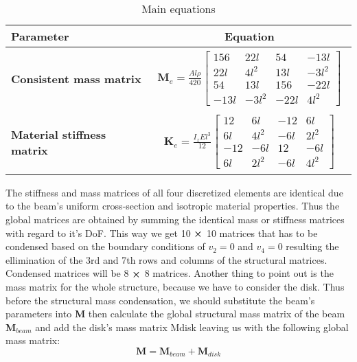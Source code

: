 \documentclass[12pt]{article}
\begin{document}
\begin{table}[H]
\centering
\caption{Main equations}
\label{tab:important_equations}
\renewcommand{\arraystretch}{1.2}
\begin{tabular}{lc}
\textbf{Parameter} & \textbf{Equation} \\
\hline
\textbf{Consistent mass matrix} &  \parbox{10cm}{\begin{align} \textbf{M}_e = \frac{Al\rho}{420} \begin{bmatrix}
156 & 22l & 54 & -13l \\
22l & 4l^2 & 13l & -3l^2 \\
54 & 13l & 156 & -22l \\
-13l & -3l^2 & -22l & 4l^2
\end{bmatrix}  \end{align}} \\

\textbf{Material stiffness matrix} & \parbox{10cm}{\begin{align} \textbf{K}_e = \frac{I_z El^3}{12} \begin{bmatrix}
12 & 6l & -12 & 6l \\
6l & 4l^2 & -6l & 2l^2 \\
-12 & -6l & 12 & -6l \\
6l & 2l^2 & -6l & 4l^2
\end{bmatrix}  \end{align}} \\

\end{tabular}
\end{table}
The stiffness and mass matrices of all four discretized elements are identical due to the beam's uniform cross-section and isotropic material properties. Thus the global matrices are obtained by summing the identical mass or stiffness matrices with regard to it's DoF. This way we get 10 $\cross$ 10 matrices that has to be condensed based on the boundary conditions of $v_2 = 0$ and $v_4= 0$ resulting the ellimination of the 3rd and 7th rows and columns of the structural matrices. Condensed
matrices will be 8 $\cross$ 8 matrices.\newline
Another thing to point out is the mass matrix for the whole structure, because we have to consider the disk. Thus before the structural mass condensation, we should substitute the beam's parameters into \textbf{M} then calculate the global structural mass matrix of the beam $\textbf{M}_{beam}$ and add the disk's mass matrix Mdisk leaving us with the following global mass matrix:
\begin{equation}
\textbf{M} = \textbf{M}_{beam} + \textbf{M}_{disk}
\end{equation}
\end{document}
